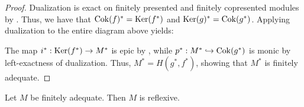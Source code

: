 \begin{proof}
  Dualization is exact on finitely presented and finitely copresented modules by . 
  Thus, we have that $\operatorname{Cok} (f)^\ast = \operatorname{Ker} (f^\ast)$ and $\operatorname{Ker} (g)^\ast = \operatorname{Cok} (g^\ast)$.
  Applying dualization to the entire diagram above yields:
  \begin{center}
  \end{center}
  The map $i^\ast : \operatorname{Ker}(f^\ast) \to M^\ast$ is epic by , while $p^\ast : M^\ast \hookrightarrow \operatorname{Cok}(g^\ast)$ is monic by left-exactness of dualization.
  Thus, $M^\ast = H(g^\ast, f^\ast)$, showing that $M^\ast$ is finitely adequate.
\end{proof}

\begin{proposition}\label{prp:can-dual-iso}
  Let $M$ be finitely adequate. Then $M$ is reflexive.
\end{proposition}

